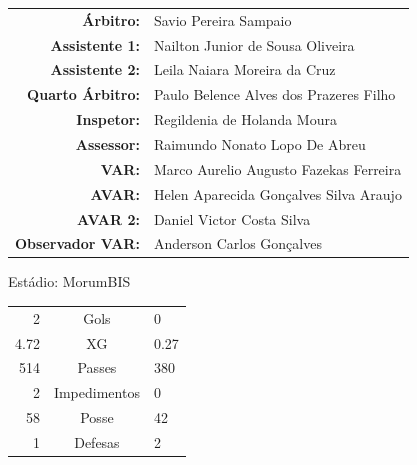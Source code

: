 \documentclass[11pt]{article}
\newcommand{\teamjersey}{}
\begin{document}
\vspace{0.5cm}
\begin{minipage}{0.65\textwidth}
\begin{center}
\begin{tabular}{rl}
\textbf{Árbitro:} & Savio Pereira Sampaio \\
\textbf{Assistente 1:} & Nailton Junior de Sousa Oliveira \\
\textbf{Assistente 2:} & Leila Naiara Moreira da Cruz \\
\textbf{Quarto Árbitro:} & Paulo Belence Alves dos Prazeres Filho \\
\textbf{Inspetor:} & Regildenia de Holanda Moura \\
\textbf{Assessor:} & Raimundo Nonato Lopo De Abreu \\
\textbf{VAR:} & Marco Aurelio Augusto Fazekas Ferreira \\
\textbf{AVAR:} & Helen Aparecida Gonçalves Silva Araujo \\
\textbf{AVAR 2:} & Daniel Victor Costa Silva \\
\textbf{Observador VAR:} & Anderson Carlos Gonçalves \\
\end{tabular}
\end{center}
\end{minipage}
\begin{minipage}{0.3\textwidth}
Estádio: MorumBIS\\
\begin{tabular}{rcl}
2 & Gols & 0 \\
4.72 & XG & 0.27 \\
514 & Passes & 380 \\
2 & Impedimentos & 0 \\
58 & Posse & 42 \\
1 & Defesas & 2 \\
\end{tabular}
\end{minipage}
\newpage
\vspace{0.5cm}
\renewcommand{\teamjersey}{../assets/camisa/costas1.png}
\end{document}

